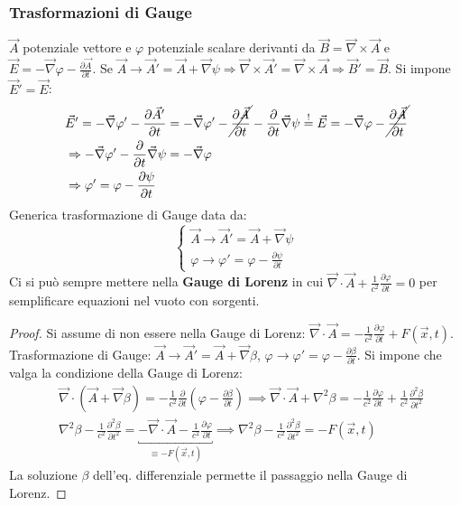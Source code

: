 \documentclass[10pt, a4paper]{scrartcl}
\numberwithin{equation}{subsection}
\theoremstyle{style1}
\newenvironment{boxenv}[1][]{
    \begin{eqbox}[#1]
    }{
   \end{eqbox}
}
\begin{document}
\subsubsection{Trasformazioni di Gauge}

$\vec{A}$ potenziale vettore e $\varphi $ potenziale scalare derivanti da $\vec{B}= \vec{\nabla }\times \vec{A}$ e $\vec{E}=-\vec{\nabla }\varphi  - \frac{\partial \vec{A}}{\partial t}$. Se $\vec{A}\to \vec{A}' = \vec{A}+\vec{\nabla }\psi \Rightarrow \vec{\nabla }\times \vec{A}' = \vec{\nabla }\times \vec{A}\Rightarrow \vec{B}' = \vec{B}$. Si impone $\vec{E}' = \vec{E}$:
\[
\begin{split}
	&\vec{E}' = - \vec{\nabla }\varphi ' - \frac{\partial \vec{A}'}{\partial t} = - \vec{\nabla }\varphi ' - \cancel{\frac{\partial \vec{A}}{\partial t} } - \frac{\partial }{\partial t} \vec{\nabla }\psi \stackrel{!}{=}\vec{E}= - \vec{\nabla }\varphi  - \cancel{\frac{\partial \vec{A}}{\partial t} }\\
	&\Rightarrow -\vec{\nabla }\varphi ' - \frac{\partial }{\partial t} \vec{\nabla }\psi  = - \vec{\nabla }\varphi \\
	&\Rightarrow \varphi ' = \varphi  - \frac{\partial \psi }{\partial t} 
\end{split}
\] 
Generica trasformazione di Gauge data da:
\begin{equation}
	\begin{cases}
		\vec{A}\to \vec{A}' = \vec{A} + \vec{\nabla }\psi \\
		 \varphi \to \varphi ' = \varphi  - \frac{\partial \psi }{\partial t} 
	\end{cases}
\end{equation}
Ci si pu\`o sempre mettere nella \textbf{Gauge di Lorenz} in cui $\vec{\nabla }\cdot \vec{A}+\frac{1}{c^2}\frac{\partial \varphi }{\partial t} = 0$ per semplificare equazioni nel vuoto con sorgenti.
\begin{boxenv}[]
\begin{proof}
	Si assume di non essere nella Gauge di Lorenz: $\vec{\nabla }\cdot \vec{A}=-\frac{1}{c^2}\frac{\partial \varphi }{\partial t} + F (\vec{x},t)$. Trasformazione di Gauge: $\vec{A}\to \vec{A}' = \vec{A} + \vec{\nabla }\beta $, $\varphi \to \varphi ' = \varphi  - \frac{\partial \beta }{\partial t}$. Si impone che valga la condizione della Gauge di Lorenz:
	\[
	\begin{split}
		&\vec{\nabla }\cdot (\vec{A}+\vec{\nabla }\beta ) = -\frac{1}{c^2}\frac{\partial }{\partial t} \left(\varphi  - \frac{\partial \beta }{\partial t} \right) \implies \vec{\nabla }\cdot \vec{A}+\nabla ^2 \beta =-\frac{1}{c^2}\frac{\partial \varphi }{\partial t}+\frac{1}{c^2}\frac{\partial ^2 \beta }{\partial t^2}\\
		&\nabla ^2 \beta  - \frac{1}{c^2} \frac{\partial ^2\beta }{\partial t^2}  = \underbracket{- \vec{\nabla }\cdot \vec{A} - \frac{1}{c^2} \frac{\partial \varphi }{\partial t} }_{\equiv - F(\vec{x},t)} \implies \nabla ^2 \beta  - \frac{1}{c^2}\frac{\partial ^2\beta }{\partial t^2} = - F(\vec{x},t)
	\end{split}
	\] 
	La soluzione $\beta $ dell'eq. differenziale permette il passaggio nella Gauge di Lorenz.
\end{proof}
\end{boxenv}
\end{document}
